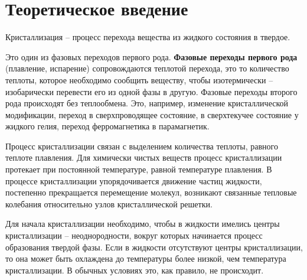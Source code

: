 \documentclass[a4paper]{article}
\begin{document}
\section{\textbf{Теоретическое введение}}

Кристаллизация – процесс перехода вещества из жидкого состояния в твердое.

Это один из фазовых переходов первого рода. \textbf{Фазовые переходы первого рода} (плавление, испарение) сопровождаются теплотой перехода, это то количество теплоты, которое необходимо сообщить веществу, чтобы изотермически – изобарически перевести его из одной фазы в другую. Фазовые переходы второго рода происходят без теплообмена. Это, например, изменение кристаллической модификации, переход в сверхпроводящее состояние, в сверхтекучее состояние у жидкого гелия, переход ферромагнетика в парамагнетик.

Процесс кристаллизации связан с выделением количества теплоты, равного теплоте плавления. Для химически чистых веществ процесс кристаллизации протекает при постоянной температуре, равной температуре плавления. В процессе кристаллизации упорядочивается движение частиц жидкости, постепенно прекращается перемещение молекул, возникают связанные тепловые колебания относительно узлов кристаллической решетки.

Для начала кристаллизации необходимо, чтобы в жидкости имелись центры кристаллизации – неоднородности, вокруг которых начинается процесс образования твердой фазы. Если в жидкости отсутствуют центры кристаллизации, то она может быть охлаждена до температуры более низкой, чем температура кристаллизации. В обычных условиях это, как правило, не происходит.
\end{document}
